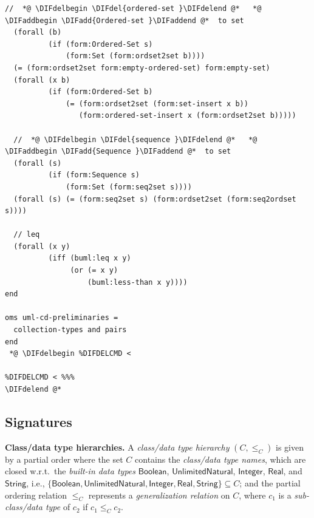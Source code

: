 \documentclass[10pt,fleqn,final]{scrreprt}
\newcommand{\uml}[1]{\textsf{#1}}
\providecommand{\DIFadd}[1]{{\protect\color{blue}\uwave{#1}}} %
\providecommand{\DIFdel}[1]{{\protect\color{red}\sout{#1}}}                      %
\providecommand{\DIFaddbegin}{} %
\providecommand{\DIFaddend}{} %
\providecommand{\DIFdelbegin}{} %
\providecommand{\DIFdelend}{} %
\begin{document}
\begin{lstlisting}[language=clif,morekeywords={then,with,logic,oms,end},mathescape]
  //  *@ \DIFdelbegin \DIFdel{ordered-set }\DIFdelend @*   *@ \DIFaddbegin \DIFadd{Ordered-set }\DIFaddend @*  to set
  (forall (b)
          (if (form:Ordered-Set s)
              (form:Set (form:ordset2set b))))
  (= (form:ordset2set form:empty-ordered-set) form:empty-set)
  (forall (x b)
          (if (form:Ordered-Set b)
              (= (form:ordset2set (form:set-insert x b))
                 (form:ordered-set-insert x (form:ordset2set b)))))

  //  *@ \DIFdelbegin \DIFdel{sequence }\DIFdelend @*   *@ \DIFaddbegin \DIFadd{Sequence }\DIFaddend @*  to set
  (forall (s)
          (if (form:Sequence s)
              (form:Set (form:seq2set s))))
  (forall (s) (= (form:seq2set s) (form:ordset2set (form:seq2ordset s))))

  // leq
  (forall (x y)
          (iff (buml:leq x y)
               (or (= x y)
                   (buml:less-than x y))))
end

oms uml-cd-preliminaries =
  collection-types and pairs
end
 *@ \DIFdelbegin %DIFDELCMD < 

%DIFDELCMD < %%%
\DIFdelend @*
\end{lstlisting}


\DIFdelbegin %
\DIFdelend \DIFaddbegin \subsection{Signatures}
\DIFaddend 

\DIFdelbegin %
\DIFdelend \textbf{Class/data type hierarchies.}  A \emph{class/data type
  hierarchy} $(C, {\leq_C})$
is given by a partial order where the set $C$
contains the \emph{class/data type names}, which are closed w.r.t.\ the
\emph{built-in data types} $\mathsf{Boolean}$,
$\mathsf{UnlimitedNatural}$,
$\mathsf{Integer}$,
$\mathsf{Real}$,
and $\mathsf{String}$,
i.e.,
$\{ \mathsf{Boolean}, \mathsf{UnlimitedNatural},\allowbreak
\mathsf{Integer}, \mathsf{Real}, \mathsf{String} \} \subseteq C$;
and the partial ordering relation $\leq_C$ represents a
\emph{generalization relation} on $C$, where $c_1$ is a
\emph{sub-class/data type} of $c_2$ if $c_1 \leq_C c_2$.
\end{document}
